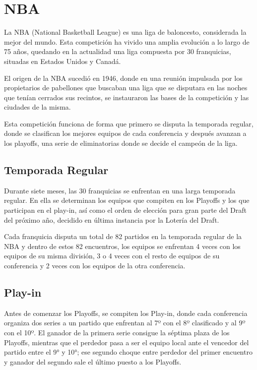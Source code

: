 
\section{NBA}
La NBA (National Basketball League) \cite{nba} es una liga de baloncesto, considerada la mejor del mundo. Esta competición ha vivido una amplia evolución a lo largo de 75 años, quedando en la actualidad una liga compuesta por 30 franquicias, situadas en Estados Unidos y Canadá.

El origen de la NBA sucedió en 1946, donde en una reunión impulsada por los propietarios de pabellones que buscaban una liga que se disputara en las noches que tenían cerrados sus recintos, se instauraron las bases de la competición y las ciudades de la misma.

Esta competición funciona de forma que primero se disputa la temporada regular, donde se clasifican los mejores equipos de cada conferencia y después avanzan a los playoffs, una serie de eliminatorias donde se decide el campeón de la liga.

\subsection{Temporada Regular}
Durante siete meses, las 30 franquicias se enfrentan en una larga temporada regular. En ella se determinan los equipos que compiten en los Playoffs y los que participan en el play-in, así como el orden de elección para gran parte del Draft del próximo año, decidido en última instancia por la Lotería del Draft.

Cada franquicia disputa un total de 82 partidos en la temporada regular de la NBA y dentro de estos 82 encuentros, los equipos se enfrentan 4 veces con los equipos de su misma división, 3 o 4 veces con el resto de equipos de su conferencia y 2 veces con los equipos de la otra conferencia.

\subsection{Play-in}
Antes de comenzar los Playoffs, se compiten los Play-in, donde cada conferencia organiza dos series a un partido que enfrentan al 7º con el 8º clasificado y al 9º con el 10º. El ganador de la primera serie consigue la séptima plaza de los Playoffs, mientras que el perdedor pasa a ser el equipo local ante el vencedor del partido entre el 9° y 10°; ese segundo choque entre perdedor del primer encuentro y ganador del segundo sale el último puesto a los Playoffs.


